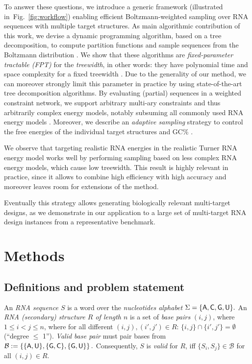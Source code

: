 \documentclass{bmcart}
\newcommand{\B}{\mathcal{B}}
\newcommand{\Def}[1]{\emph{#1}}
\newcommand{\Nuc}[1]{{\sf #1}}
\newcommand{\Ab}{\Nuc{A}}
\newcommand{\Cb}{\Nuc{C}}
\newcommand{\Gb}{\Nuc{G}}
\newcommand{\Ub}{\Nuc{U}}
\newcommand{\GCb}{\Gb\Cb}
\begin{document}
To answer these questions, we introduce a generic framework (illustrated in~Fig.~\ref{fig:workflow}) enabling efficient Boltzmann-weighted sampling over RNA sequences with multiple target structures. As main algorithmic contribution of this work, we devise a dynamic programming algorithm, based on a tree decomposition, to compute partition functions and sample sequences from the Boltzmann distribution%
. We show that these algorithms are \Def{fixed-parameter tractable (FPT)} for the \Def{treewidth},
in other words: they have polynomial time and space complexity for a fixed treewidth%
%
. Due to the generality of our method, we can moreover strongly limit this parameter in practice by using state-of-the-art tree decomposition algorithms.
By evaluating (partial) sequences in a weighted constraint
network, we support arbitrary multi-ary constraints and thus
arbitrarily complex energy models,
notably subsuming all commonly
used RNA energy models%
.  Moreover, we describe an \Def{adaptive
  sampling} strategy to control the free energies of the individual
target structures and \GCb\%%
. %

We observe that
targeting realistic RNA energies in the realistic
Turner RNA energy model
works well by performing sampling based on less complex RNA energy models, which cause low treewidth. This result is highly relevant in practice, since it allows to combine high efficiency with high accuracy and moreover leaves room for extensions of the method.

Eventually this strategy allows generating biologically relevant
multi-target designs, as we demonstrate in our application 
to a large set of multi-target RNA design instances from a
representative benchmark.

\section*{Methods}
\subsection*{Definitions and problem statement}
\label{sec:problem-statement}

An \Def{RNA sequence $S$} is a word over the \Def{nucleotides
  alphabet} $\Sigma=\{\Ab,\Cb,\Gb,\Ub\}.$
An \Def{RNA (secondary) structure $R$ of
  length $n$} is a set of \Def{base pairs} $(i,j)$, where
$1\leq i<j\leq n$, where for all different $(i,j), (i',j')\in R$:
$\{i,j\}\cap\{i',j'\}=\emptyset$ (``degree $\leq$ 1'').
%
%
\Def{Valid base pair} must pair bases from
$\B:=\left\{\{\Ab,\Ub\},\{\Gb,\Cb\},\{\Gb,\Ub\}\right\}.$
Consequently, $S$ is \Def{valid} for $R$, iff $\{S_i,S_j\}\in \B$ for
all $(i,j)\in R$.
 
\end{document}
